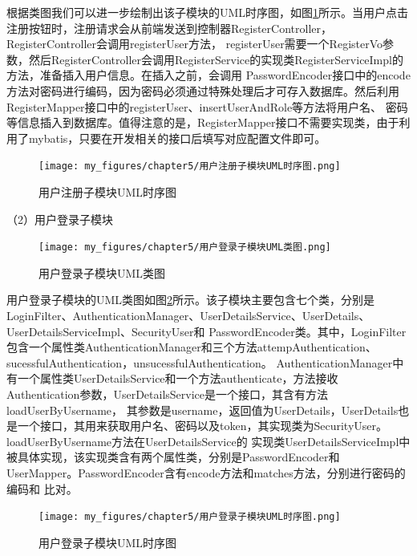 根据类图我们可以进一步绘制出该子模块的UML时序图，如图\ref{fig:用户注册子模块UML时序图}所示。当用户点击注册按钮时，注册请求会从前端发送到控制器RegisterController，RegisterController会调用registerUser方法，
registerUser需要一个RegisterVo参数，然后RegisterController会调用RegisterService的实现类RegisterServiceImpl的方法，准备插入用户信息。在插入之前，会调用
PasswordEncoder接口中的encode方法对密码进行编码，因为密码必须通过特殊处理后才可存入数据库。然后利用RegisterMapper接口中的registerUser、insertUserAndRole等方法将用户名、
密码等信息插入到数据库。值得注意的是，RegisterMapper接口不需要实现类，由于利用了mybatis，只要在开发相关的接口后填写对应配置文件即可。

\begin{figure}[htb]
    \centering
    \texttt{[image: my\_figures/chapter5/用户注册子模块UML时序图.png]}
    \caption{用户注册子模块UML时序图}
    \label{fig:用户注册子模块UML时序图}
\end{figure}

（2）用户登录子模块

\begin{figure}[htb]
    \centering
    \texttt{[image: my\_figures/chapter5/用户登录子模块UML类图.png]}
    \caption{用户登录子模块UML类图}
    \label{fig:用户登录子模块UML类图}
\end{figure}

用户登录子模块的UML类图如图\ref{fig:用户登录子模块UML类图}所示。该子模块主要包含七个类，分别是LoginFilter、AuthenticationManager、UserDetailsService、UserDetails、UserDetailsServiceImpl、SecurityUser和
PasswordEncoder类。其中，LoginFilter包含一个属性类AuthenticationManager和三个方法attempAuthentication、sucessfulAuthentication，unsucessfulAuthentication。
AuthenticationManager中有一个属性类UserDetailsService和一个方法authenticate，方法接收Authentication参数，UserDetailsService是一个接口，其含有方法loadUserByUsername，
其参数是username，返回值为UserDetails，UserDetails也是一个接口，其用来获取用户名、密码以及token，其实现类为SecurityUser。loadUserByUsername方法在UserDetailsService的
实现类UserDetailsServiceImpl中被具体实现，该实现类含有两个属性类，分别是PasswordEncoder和UserMapper。PasswordEncoder含有encode方法和matches方法，分别进行密码的编码和
比对。

\begin{figure}[htb]
    \centering
    \texttt{[image: my\_figures/chapter5/用户登录子模块UML时序图.png]}
    \caption{用户登录子模块UML时序图}
    \label{fig:用户登录子模块UML时序图}
\end{figure}


